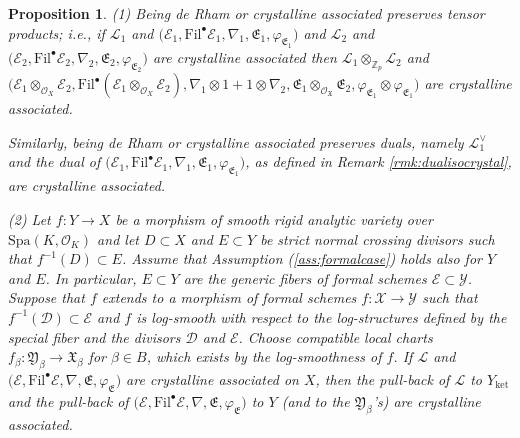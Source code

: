 \documentclass[asterisque,english]{smfart}
\newtheorem{proposition}[theo]{Proposition}
\begin{document}
\begin{proposition}\label{prop:FunctAss}
(1) Being de Rham or crystalline associated preserves tensor products; i.e., if $\mathcal{L}_1$ and $\bigl(\mathcal{E}_1,\mathrm{Fil}^\bullet \mathcal{E}_1, \nabla_1,\mathfrak{E}_1,\varphi_{\mathfrak{E}_1}\bigr) $ and $\mathcal{L}_2$ and $\bigl(\mathcal{E}_2,\mathrm{Fil}^\bullet \mathcal{E}_2, \nabla_2,\mathfrak{E}_2,\varphi_{\mathfrak{E}_2}\bigr) $  are crystalline associated then $\mathcal{L}_1\otimes_{\mathbb{Z}_p} \mathcal{L}_2$ and $\bigl(\mathcal{E}_1\otimes_{\mathcal{O}_X} \mathcal{E}_2, \mathrm{Fil}^\bullet (\mathcal{E}_1\otimes_{\mathcal{O}_X} \mathcal{E}_2), \nabla_1 \otimes 1 + 1 \otimes \nabla_2,\mathfrak{E}_1\otimes_{\mathcal{O}_{\mathfrak{X}}} \mathfrak{E}_2,\varphi_{\mathfrak{E}_1}\otimes \varphi_{\mathfrak{E}_1}\bigr) $ are crystalline associated. 

Similarly, being de Rham or crystalline associated preserves duals, namely $\mathcal{L}_1^\vee$ and the dual of $\bigl(\mathcal{E}_1,\mathrm{Fil}^\bullet \mathcal{E}_1, \nabla_1,\mathfrak{E}_1,\varphi_{\mathfrak{E}_1}\bigr) $, as defined in Remark \ref{rmk:dualisocrystal},  are crystalline associated. 

\medskip 
(2) Let $f\colon Y\to X$ be a morphism of smooth rigid analytic variety over $\mathrm{Spa}(K,\mathcal{O}_K)$ and let  $D\subset X$ and $E\subset Y$ be strict normal crossing divisors such that $f^{-1}(D)\subset E$. Assume that Assumption (\ref{ass:formalcase}) holds also for $Y$ and $E$. In particular, $E\subset Y$ are the generic fibers of formal schemes $\mathcal{E}\subset \mathcal{Y}$. Suppose that $f$ extends to a morphism of formal schemes $f\colon \mathcal{X}\to \mathcal{Y}$ such that $f^{-1}(\mathcal{D})\subset \mathcal{E}$ and $f$ is log-smooth with respect to the log-structures defined by the special fiber and the divisors $\mathcal{D}$ and $\mathcal{E}$. Choose compatible local charts $f_\beta\colon \mathfrak{Y}_\beta  \to \mathfrak{X}_\beta$ for $\beta\in B$, which exists by the log-smoothness of $f$. If  
$\mathcal{L}$ and $\bigl(\mathcal{E},\mathrm{Fil}^\bullet \mathcal{E}, \nabla,\mathfrak{E},\varphi_{\mathfrak{E}}\bigr) $ are crystalline associated on $X$, then the pull-back of $\mathcal{L}$ to $Y_{\mathrm{ket}}$ and the pull-back of $\bigl(\mathcal{E},\mathrm{Fil}^\bullet \mathcal{E}, \nabla,\mathfrak{E},\varphi_{\mathfrak{E}}\bigr) $ to $Y$ (and to the $\mathfrak{Y}_\beta$'s)  are crystalline associated.

\end{proposition}
\end{document}
